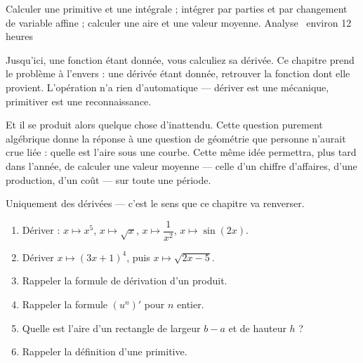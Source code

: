   {Calculer une primitive et une intégrale ; intégrer par parties et par
   changement de variable affine ; calculer une aire et une valeur moyenne.}
  {Analyse \textbullet\ environ 12 heures}

Jusqu'ici, une fonction étant donnée, vous calculiez sa dérivée. Ce chapitre
prend le problème à l'envers : une dérivée étant donnée, retrouver la fonction
dont elle provient. L'opération n'a rien d'automatique — dériver est une
mécanique, primitiver est une reconnaissance.

Et il se produit alors quelque chose d'inattendu. Cette question purement
algébrique donne la réponse à une question de géométrie que personne
n'aurait crue liée : quelle est l'aire sous une courbe. Cette même idée
permettra, plus tard dans l'année, de calculer une valeur moyenne — celle
d'un chiffre d'affaires, d'une production, d'un coût — sur toute une période.

\begin{revision}
Uniquement des dérivées — c'est le sens que ce chapitre va renverser.

\begin{enumerate}[label=\textbf{\arabic*.}, leftmargin=*, itemsep=0.35em]
  \item Dériver : $x \mapsto x^{5}$, $x \mapsto \sqrt{x}$,
        $x \mapsto \dfrac{1}{x^{2}}$, $x \mapsto \sin(2x)$.
  \item Dériver $x \mapsto (3x+1)^{4}$, puis $x \mapsto \sqrt{2x-5}$.
  \item Rappeler la formule de dérivation d'un produit.
  \item Rappeler la formule $\left(u^{n}\right)'$ pour $n$ entier.
  \item Quelle est l'aire d'un rectangle de largeur $b-a$ et de hauteur $h$ ?
  \item Rappeler la définition d'une primitive.
\end{enumerate}
\end{revision}

